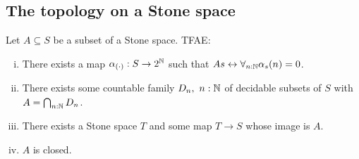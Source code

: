 \subsection{The topology on a Stone space}
\begin{theorem}\label{StrongVersionOfEquivalencesOfClosedSubsetsOfStone}
  Let $A\subseteq S$ be a subset of a Stone space. TFAE:
  \begin{enumerate}[(i)]
    \item There exists a map $\alpha_{(\cdot)}:S \to 2^{\mathbb{N}}$ such that 
      $A s \leftrightarrow \forall_{n:\mathbb{N}} \alpha_s(n) = 0$.
    \item There exists some countable family 
      $D_n,~{n:\mathbb{N}}$ 
      of decidable subsets of $S$ with $A = \bigcap_{n:\mathbb{N}} D_n$. 
    \item There exists a Stone space $T$ and some map $T\to S$ whose image is $A$. 
    \item $A$ is closed.
  \end{enumerate}
\end{theorem}
